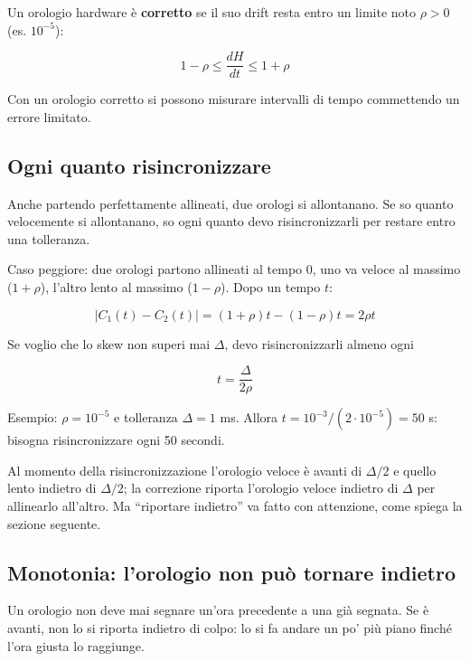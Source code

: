 Un orologio hardware è \textbf{corretto} se il suo drift resta entro un limite noto \(\rho > 0\) (es. \(10^{-5}\)):

\[
1 - \rho \le \frac{dH}{dt} \le 1 + \rho
\]

Con un orologio corretto si possono misurare intervalli di tempo commettendo un errore limitato.

\subsection{Ogni quanto risincronizzare}

\begin{inbreve}

Anche partendo perfettamente allineati, due orologi si allontanano. Se so quanto velocemente si allontanano, so ogni quanto devo risincronizzarli per restare entro una tolleranza.

\end{inbreve}

Caso peggiore: due orologi partono allineati al tempo 0, uno va veloce al massimo (\(1+\rho\)), l'altro lento al massimo (\(1-\rho\)). Dopo un tempo \(t\):

\[
|C_1(t) - C_2(t)| = (1+\rho)t - (1-\rho)t = 2\rho t
\]

Se voglio che lo skew non superi mai \(\Delta\), devo risincronizzarli almeno ogni

\[
t = \frac{\Delta}{2\rho}
\]

Esempio: \(\rho = 10^{-5}\) e tolleranza \(\Delta = 1\) ms. Allora \(t = 10^{-3} / (2 \cdot 10^{-5}) = 50\) s: bisogna risincronizzare ogni 50 secondi.

Al momento della risincronizzazione l'orologio veloce è avanti di \(\Delta/2\) e quello lento indietro di \(\Delta/2\); la correzione riporta l'orologio veloce indietro di \(\Delta\) per allinearlo all'altro. Ma ``riportare indietro'' va fatto con attenzione, come spiega la sezione seguente.

\subsection{Monotonia: l'orologio non può tornare indietro}

\begin{inbreve}

Un orologio non deve mai segnare un'ora precedente a una già segnata. Se è avanti, non lo si riporta indietro di colpo: lo si fa andare un po' più piano finché l'ora giusta lo raggiunge.

\end{inbreve}

